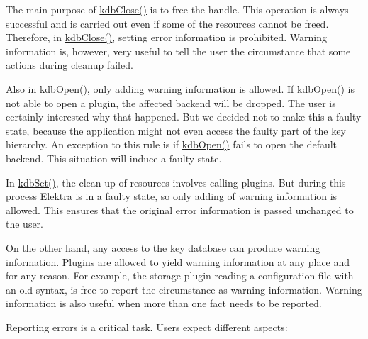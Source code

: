 \begin{DoxyItemize}
\item The main purpose of {\ttfamily \hyperlink{group__kdb_gadb54dc9fda17ee07deb9444df745c96f}{kdb\+Close()}} is to free the handle. This operation is always successful and is carried out even if some of the resources cannot be freed. Therefore, in {\ttfamily \hyperlink{group__kdb_gadb54dc9fda17ee07deb9444df745c96f}{kdb\+Close()}}, setting error information is prohibited. Warning information is, however, very useful to tell the user the circumstance that some actions during cleanup failed.
\item Also in {\ttfamily \hyperlink{group__kdb_ga844e1299a84c3fbf1d3a905c5c893ba5}{kdb\+Open()}}, only adding warning information is allowed. If {\ttfamily \hyperlink{group__kdb_ga844e1299a84c3fbf1d3a905c5c893ba5}{kdb\+Open()}} is not able to open a plugin, the affected backend will be dropped. The user is certainly interested why that happened. But we decided not to make this a faulty state, because the application might not even access the faulty part of the key hierarchy. An exception to this rule is if {\ttfamily \hyperlink{group__kdb_ga844e1299a84c3fbf1d3a905c5c893ba5}{kdb\+Open()}} fails to open the default backend. This situation will induce a faulty state.
\item In {\ttfamily \hyperlink{group__kdb_ga11436b058408f83d303ca5e996832bcf}{kdb\+Set()}}, the clean-\/up of resources involves calling plugins. But during this process Elektra is in a faulty state, so only adding of warning information is allowed. This ensures that the original error information is passed unchanged to the user.
\end{DoxyItemize}

On the other hand, any access to the key database can produce warning information. Plugins are allowed to yield warning information at any place and for any reason. For example, the storage plugin reading a configuration file with an old syntax, is free to report the circumstance as warning information. Warning information is also useful when more than one fact needs to be reported.

Reporting errors is a critical task. Users expect different aspects\+:



